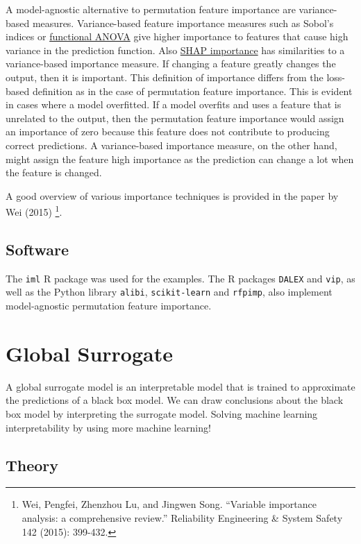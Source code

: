 \documentclass[
  10pt,
]{scrbook}
\begin{document}
A model-agnostic alternative to permutation feature importance are variance-based measures.
Variance-based feature importance measures such as Sobol's indices or \protect\hyperlink{decomposition}{functional ANOVA} give higher importance to features that cause high variance in the prediction function.
Also \protect\hyperlink{shap}{SHAP importance} has similarities to a variance-based importance measure.
If changing a feature greatly changes the output, then it is important.
This definition of importance differs from the loss-based definition as in the case of permutation feature importance.
This is evident in cases where a model overfitted.
If a model overfits and uses a feature that is unrelated to the output, then the permutation feature importance would assign an importance of zero because this feature does not contribute to producing correct predictions.
A variance-based importance measure, on the other hand, might assign the feature high importance as the prediction can change a lot when the feature is changed.

A good overview of various importance techniques is provided in the paper by Wei (2015) \footnote{Wei, Pengfei, Zhenzhou Lu, and Jingwen Song. ``Variable importance analysis: a comprehensive review.'' Reliability Engineering \& System Safety 142 (2015): 399-432.}.

\hypertarget{software-3}{%
\subsection{Software}\label{software-3}}

The \texttt{iml} R package was used for the examples.
The R packages \texttt{DALEX} and \texttt{vip}, as well as the Python library \texttt{alibi}, \texttt{scikit-learn} and \texttt{rfpimp}, also implement model-agnostic permutation feature importance.

\newpage

\hypertarget{global}{%
\section{Global Surrogate}\label{global}}

A global surrogate model is an interpretable model that is trained to approximate the predictions of a black box model.
We can draw conclusions about the black box model by interpreting the surrogate model.
Solving machine learning interpretability by using more machine learning!

\hypertarget{theory-4}{%
\subsection{Theory}\label{theory-4}}
\end{document}
